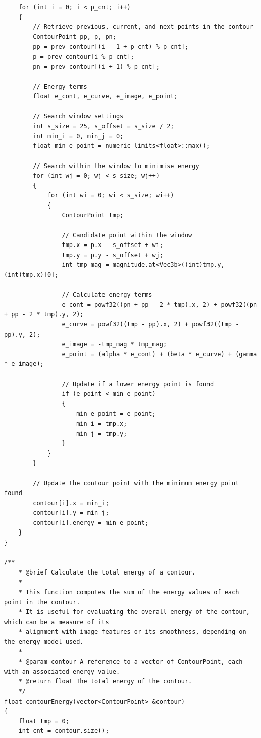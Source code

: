\documentclass[12pt,a4paper]{report}
\begin{document}
\begin{lstlisting}
    for (int i = 0; i < p_cnt; i++)
    {
        // Retrieve previous, current, and next points in the contour
        ContourPoint pp, p, pn;
        pp = prev_contour[(i - 1 + p_cnt) % p_cnt];
        p = prev_contour[i % p_cnt];
        pn = prev_contour[(i + 1) % p_cnt];

        // Energy terms
        float e_cont, e_curve, e_image, e_point;

        // Search window settings
        int s_size = 25, s_offset = s_size / 2;
        int min_i = 0, min_j = 0;
        float min_e_point = numeric_limits<float>::max();

        // Search within the window to minimise energy
        for (int wj = 0; wj < s_size; wj++)
        {
            for (int wi = 0; wi < s_size; wi++)
            {
                ContourPoint tmp;

                // Candidate point within the window
                tmp.x = p.x - s_offset + wi;
                tmp.y = p.y - s_offset + wj;
                int tmp_mag = magnitude.at<Vec3b>((int)tmp.y, (int)tmp.x)[0];

                // Calculate energy terms
                e_cont = powf32((pn + pp - 2 * tmp).x, 2) + powf32((pn + pp - 2 * tmp).y, 2);
                e_curve = powf32((tmp - pp).x, 2) + powf32((tmp - pp).y, 2);
                e_image = -tmp_mag * tmp_mag;
                e_point = (alpha * e_cont) + (beta * e_curve) + (gamma * e_image);

                // Update if a lower energy point is found
                if (e_point < min_e_point)
                {
                    min_e_point = e_point;
                    min_i = tmp.x;
                    min_j = tmp.y;
                }
            }
        }

        // Update the contour point with the minimum energy point found
        contour[i].x = min_i;
        contour[i].y = min_j;
        contour[i].energy = min_e_point;
    }
}

/**
    * @brief Calculate the total energy of a contour.
    *
    * This function computes the sum of the energy values of each point in the contour.
    * It is useful for evaluating the overall energy of the contour, which can be a measure of its
    * alignment with image features or its smoothness, depending on the energy model used.
    *
    * @param contour A reference to a vector of ContourPoint, each with an associated energy value.
    * @return float The total energy of the contour.
    */
float contourEnergy(vector<ContourPoint> &contour)
{
    float tmp = 0;
    int cnt = contour.size();


\end{lstlisting}
\end{document}
